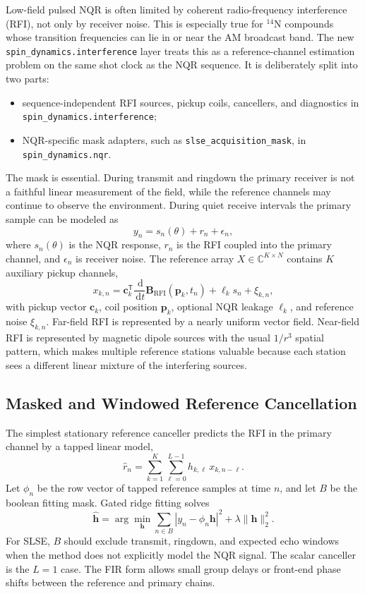 \documentclass[11pt,oneside]{report}
\newcommand{\code}[1]{\texttt{#1}}
\newcommand{\dd}{\,\mathrm{d}}
\begin{document}
Low-field pulsed NQR is often limited by coherent radio-frequency interference
(RFI), not only by receiver noise. This is especially true for
\({}^{14}\mathrm{N}\) compounds whose transition frequencies can lie in or near
the AM broadcast band. The new \code{spin\_dynamics.interference} layer treats
this as a reference-channel estimation problem on the same shot clock as the
NQR sequence. It is deliberately split into two parts:

\begin{itemize}
  \item sequence-independent RFI sources, pickup coils, cancellers, and
  diagnostics in \code{spin\_dynamics.\allowbreak interference};
  \item NQR-specific mask adapters, such as \code{slse\_acquisition\_mask}, in
  \code{spin\_dynamics.nqr}.
\end{itemize}

The mask is essential. During transmit and ringdown the primary receiver is not
a faithful linear measurement of the field, while the reference channels may
continue to observe the environment. During quiet receive intervals the primary
sample can be modeled as
\[
  y_n = s_n(\theta) + r_n + \epsilon_n,
\]
where \(s_n(\theta)\) is the NQR response, \(r_n\) is the RFI coupled into the
primary channel, and \(\epsilon_n\) is receiver noise. The reference array
\(X\in\mathbb{C}^{K\times N}\) contains \(K\) auxiliary pickup channels,
\[
  x_{k,n} =
  \mathbf{c}_k^{\mathsf T}
  \frac{\dd}{\dd t}\mathbf{B}_{\mathrm{RFI}}(\mathbf{p}_k,t_n)
  + \ell_k s_n + \xi_{k,n},
\]
with pickup vector \(\mathbf{c}_k\), coil position \(\mathbf{p}_k\), optional
NQR leakage \(\ell_k\), and reference noise \(\xi_{k,n}\). Far-field RFI is
represented by a nearly uniform vector field. Near-field RFI is represented by
magnetic dipole sources with the usual \(1/r^3\) spatial pattern, which makes
multiple reference stations valuable because each station sees a different
linear mixture of the interfering sources.

\subsection{Masked and Windowed Reference Cancellation}

The simplest stationary reference canceller predicts the RFI in the primary
channel by a tapped linear model,
\[
  \widehat{r}_n =
  \sum_{k=1}^{K}\sum_{\ell=0}^{L-1} h_{k,\ell}\,x_{k,n-\ell}.
\]
Let \(\phi_n\) be the row vector of tapped reference samples at time \(n\), and
let \(B\) be the boolean fitting mask. Gated ridge fitting solves
\[
  \widehat{\mathbf{h}}
  =
  \arg\min_{\mathbf{h}}
  \sum_{n\in B}|y_n-\phi_n\mathbf{h}|^2
  + \lambda\|\mathbf{h}\|_2^2.
\]
For SLSE, \(B\) should exclude transmit, ringdown, and expected echo windows
when the method does not explicitly model the NQR signal. The scalar canceller
is the \(L=1\) case. The FIR form allows small group delays or front-end phase
shifts between the reference and primary chains.
\end{document}
